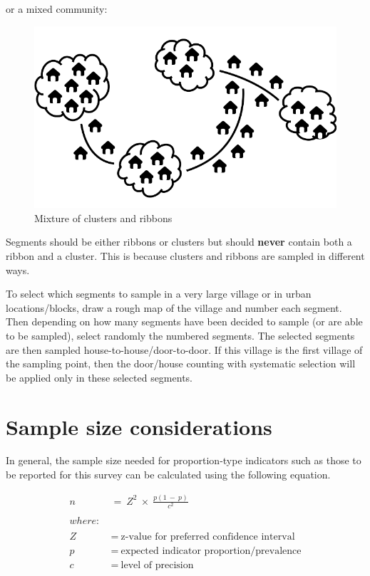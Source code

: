 \documentclass[12pt,a4paper]{book}
\theoremstyle{definition}
\theoremstyle{definition}
\theoremstyle{definition}
\theoremstyle{remark}
\begin{document}
or a mixed community:

\begin{figure}[H]

{\centering \includegraphics[width=9.72in]{figures/stage2sample5} 

}

\caption{Mixture of clusters and ribbons}\label{fig:sample19}
\end{figure}

Segments should be either ribbons or clusters but should \textbf{never}
contain both a ribbon and a cluster. This is because clusters and
ribbons are sampled in different ways.

To select which segments to sample in a very large village or in urban
locations/blocks, draw a rough map of the village and number each
segment. Then depending on how many segments have been decided to sample
(or are able to be sampled), select randomly the numbered segments. The
selected segments are then sampled house-to-house/door-to-door. If this
village is the first village of the sampling point, then the door/house
counting with systematic selection will be applied only in these
selected segments.

\hypertarget{samplesize}{%
\section{Sample size considerations}\label{samplesize}}

In general, the sample size needed for proportion-type indicators such
as those to be reported for this survey can be calculated using the
following equation.

\[\begin{aligned}
n & ~ = ~ Z^2 ~ \times ~ \frac{p(1 ~ - ~ p)}{c ^ 2} \\
\\
where: & \\
\\
Z & ~ = ~ \text{z-value for preferred confidence interval} \\
p & ~ = ~ \text{expected indicator proportion/prevalence} \\
c & ~ = ~ \text{level of precision}
\end{aligned}\]
\end{document}
